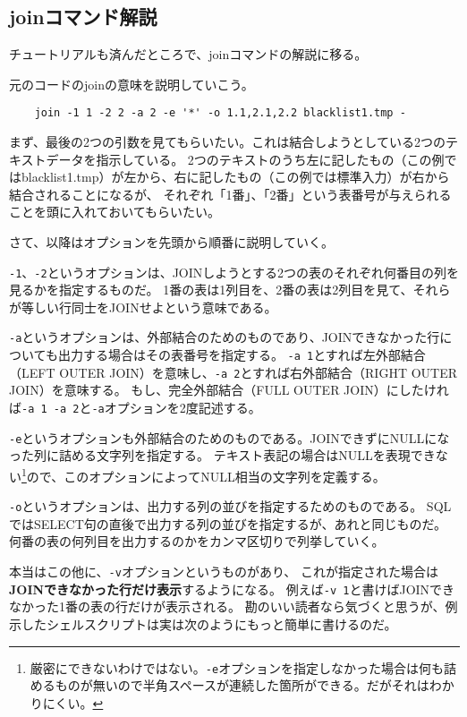 \subsection*{joinコマンド解説}

チュートリアルも済んだところで、joinコマンドの解説に移る。


元のコードのjoinの意味を説明していこう。
\begin{verbatim}
	join -1 1 -2 2 -a 2 -e '*' -o 1.1,2.1,2.2 blacklist1.tmp -
\end{verbatim}

まず、最後の2つの引数を見てもらいたい。これは結合しようとしている2つのテキストデータを指示している。
2つのテキストのうち左に記したもの（この例ではblacklist1.tmp）が左から、右に記したもの（この例では標準入力）が右から結合されることになるが、
それぞれ「1番」、「2番」という表番号が与えられることを頭に入れておいてもらいたい。

さて、以降はオプションを先頭から順番に説明していく。

\verb|-1|、\verb|-2|というオプションは、JOINしようとする2つの表のそれぞれ何番目の列を見るかを指定するものだ。
1番の表は1列目を、2番の表は2列目を見て、それらが等しい行同士をJOINせよという意味である。

\verb|-a|というオプションは、外部結合のためのものであり、JOINできなかった行についても出力する場合はその表番号を指定する。
\verb|-a 1|とすれば左外部結合（LEFT OUTER JOIN）を意味し、\verb|-a 2|とすれば右外部結合（RIGHT OUTER JOIN）を意味する。
もし、完全外部結合（FULL OUTER JOIN）にしたければ\verb|-a 1 -a 2|と\verb|-a|オプションを2度記述する。

\verb|-e|というオプションも外部結合のためのものである。JOINできずにNULLになった列に詰める文字列を指定する。
テキスト表記の場合はNULLを表現できない\footnote{厳密にできないわけではない。\verb|-e|オプションを指定しなかった場合は何も詰めるものが無いので半角スペースが連続した箇所ができる。だがそれはわかりにくい。}ので、このオプションによってNULL相当の文字列を定義する。

\verb|-o|というオプションは、出力する列の並びを指定するためのものである。
SQLではSELECT句の直後で出力する列の並びを指定するが、あれと同じものだ。
何番の表の何列目を出力するのかをカンマ区切りで列挙していく。

本当はこの他に、\verb|-v|オプションというものがあり、
これが指定された場合は\textbf{JOINできなかった行だけ表示}するようになる。
例えば\verb|-v 1|と書けばJOINできなかった1番の表の行だけが表示される。
勘のいい読者なら気づくと思うが、例示したシェルスクリプトは実は次のようにもっと簡単に書けるのだ。

